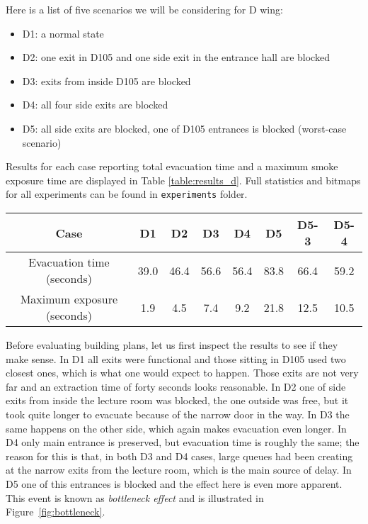 Here is a list of five scenarios we will be considering for D wing:

\begin{itemize}
    \item D1: a normal state
    \item D2: one exit in D105 and one side exit in the entrance hall are
    blocked
    \item D3: exits from inside D105 are blocked
    \item D4: all four side exits are blocked
    \item D5: all side exits are blocked, one of D105 entrances is blocked
    (worst-case scenario)
\end{itemize}

Results for each case reporting total evacuation time and a maximum smoke
exposure time are displayed in Table \ref{table:results_d}.
Full statistics and bitmaps for all experiments can be found in
\texttt{experiments} folder.

\begin{center}
    \label{table:results_d}
    \begin{tabular}{ c | c | c | c | c | c | c | c }
        \hline
        Case & D1 & D2 & D3 & D4 & D5 & D5-3 & D5-4 \\
        \hline
        Evacuation time (seconds) & 39.0 & 46.4 & 56.6 & 56.4 & 83.8 & 66.4 & 59.2 \\
        Maximum exposure (seconds) & 1.9 & 4.5 & 7.4 & 9.2 & 21.8 & 12.5 & 10.5 \\
        \hline
    \end{tabular}
\end{center}

Before evaluating building plans, let us first inspect the results to see if
they make sense.
In D1 all exits were functional and those sitting in D105 used two closest ones,
which is what one would expect to happen.
Those exits are not very far and an extraction time of forty seconds looks
reasonable.
In D2 one of side exits from inside the lecture room was blocked, the one
outside was free, but it took quite longer to evacuate because of the
narrow door in the way.
In D3 the same happens on the other side, which again makes evacuation even
longer.
In D4 only main entrance is preserved, but evacuation time is roughly the same;
the reason for this is that, in both D3 and D4 cases, large queues had been
creating at the narrow exits from the lecture room, which is the main source
of delay.
In D5 one of this entrances is blocked and the effect here is even more
apparent.
This event is known as \emph{bottleneck effect} and is illustrated in
Figure~\ref{fig:bottleneck}.

